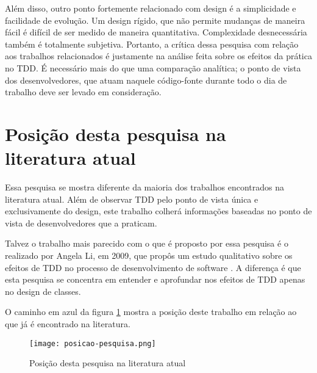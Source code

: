 Além disso, outro ponto fortemente relacionado com design é a simplicidade e
facilidade de evolução. Um design rígido, que não permite mudanças de maneira
fácil é difícil de ser medido de maneira quantitativa. Complexidade
desnecessária também é totalmente subjetiva. Portanto, a crítica dessa pesquisa
com relação aos trabalhos relacionados é justamente na análise feita sobre os
efeitos da prática no TDD. É necessário mais do que uma comparação analítica; o
ponto de vista dos desenvolvedores, que atuam naquele código-fonte durante todo
o dia de trabalho deve ser levado em consideração.

\section{Posição desta pesquisa na literatura atual}

Essa pesquisa se mostra diferente da maioria dos trabalhos encontrados na
literatura atual. Além de observar TDD pelo ponto de vista única e
exclusivamente do design, este trabalho colherá informações baseadas no ponto de
vista de desenvolvedores que a praticam.

Talvez o trabalho mais parecido com o que é proposto por essa pesquisa é o
realizado por Angela Li, em 2009, que propôs um estudo qualitativo sobre os
efeitos de TDD no processo de desenvolvimento de software \cite{angela-li}. 
A diferença é que esta pesquisa se concentra em entender e aprofundar nos
efeitos de TDD apenas no design de classes.

O caminho em azul da figura \ref{fig:posicao-pesquisa} mostra a posição deste
trabalho em relação ao que já é encontrado na literatura.

\begin{landscape}
\begin{figure}
  \centering
  \texttt{[image: posicao-pesquisa.png]}
  \caption{Posição desta pesquisa na literatura atual}
  \label{fig:posicao-pesquisa}
\end{figure}
\end{landscape}

